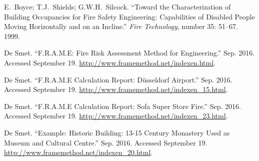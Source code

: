 \documentclass{style/llncs}
\begin{document}
{\begin{thebibliography}{36}
E.~Boyce; T.J.~Shields; G.W.H.~Silcock. \textquotedblleft{}Toward the Characterization of Building Occupancies for Fire Safety Engineering: Capabilities of Disabled People Moving Horizontally and on an Incline.\textquotedblright{} \emph{Fire Technology}, number 35: 51–67. 1999.\label{36}%

De Smet. \textquotedblleft{}F.R.A.M.E: Fire Risk Assessment Method for Engineering.\textquotedblright{} Sep. 2016. Accessed September 19. \href{http://www.framemethod.net/indexen.html}{{\ttfamily http://\hspace{0pt}www.\hspace{0pt}framemethod.\hspace{0pt}net/\hspace{0pt}indexen.\hspace{0pt}html}}.\label{25}%

De Smet. \textquotedblleft{}F.R.A.M.E Calculation Report: Düsseldorf Airport.\textquotedblright{} Sep. 2016. Accessed September 19. \href{http://www.framemethod.net/indexen_15.html}{{\ttfamily http://\hspace{0pt}www.\hspace{0pt}framemethod.\hspace{0pt}net/\hspace{0pt}indexen\_\hspace{0pt}15.\hspace{0pt}html}}.\label{26}%

De Smet. \textquotedblleft{}F.R.A.M.E Calculation Report: Sofa Super Store Fire.\textquotedblright{} Sep. 2016. Accessed September 19. \href{http://www.framemethod.net/indexen_23.html}{{\ttfamily http://\hspace{0pt}www.\hspace{0pt}framemethod.\hspace{0pt}net/\hspace{0pt}indexen\_\hspace{0pt}23.\hspace{0pt}html}}.\label{27}%

De Smet. \textquotedblleft{}Example: Historic Building: 13-15 Century Monastery Used as Museum and Cultural Centre.\textquotedblright{} Sep. 2016. Accessed September 19. \href{http://www.framemethod.net/indexen_20.html}{{\ttfamily http://\hspace{0pt}www.\hspace{0pt}framemethod.\hspace{0pt}net/\hspace{0pt}indexen\_\hspace{0pt}20.\hspace{0pt}html}}.\label{28}%


\end{thebibliography}}
\end{document}
